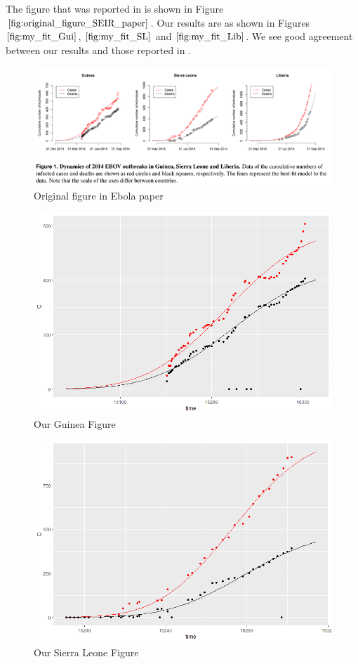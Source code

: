 The figure that was reported in  \cite{althaus2014estimating} is shown in Figure $\ref{fig:original_figure_SEIR_paper}$. Our results are as shown in Figures $\ref{fig:my_fit_Gui}$, $\ref{fig:my_fit_SL}$ and $\ref{fig:my_fit_Lib}$. We see good agreement between our results and those reported in  \cite{althaus2014estimating}.

\begin{figure}[h]
\centering
\includegraphics[width=1\linewidth]{./figures/original_figure_SEIR_paper}
\caption{Original figure in Ebola paper}
\label{fig:original_figure_SEIR_paper}
\end{figure}

\begin{figure}[h]
\centering
\includegraphics[width=0.7\linewidth]{./figures/my_fit_Gui}
\caption{Our Guinea Figure}
\label{fig:my_fit_Gui}
\end{figure}

\begin{figure}[h]
\centering
\includegraphics[width=0.7\linewidth]{./figures/my_fit_SL}
\caption{Our Sierra Leone Figure}
\label{fig:my_fit_SL}
\end{figure}

